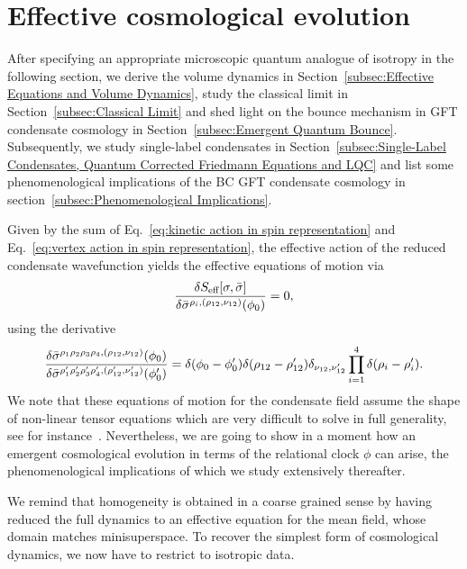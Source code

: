 \documentclass[11pt,a4paper]{article}
\begin{document}
\section{Effective cosmological evolution}\label{sec:Evolution of Effective Cosmology}

 After specifying an appropriate microscopic quantum analogue of isotropy in the following section, we derive the volume dynamics in Section~\ref{subsec:Effective Equations and Volume Dynamics}, study the classical limit in Section~\ref{subsec:Classical Limit} and shed light on the bounce mechanism in GFT condensate cosmology in Section~\ref{subsec:Emergent Quantum Bounce}. Subsequently, we study single-label condensates in Section~\ref{subsec:Single-Label Condensates, Quantum Corrected Friedmann Equations and LQC} and list some phenomenological implications of the BC GFT condensate cosmology in section~\ref{subsec:Phenomenological Implications}.

Given by the sum of Eq.~\eqref{eq:kinetic action in spin representation} and Eq.~\eqref{eq:vertex action in spin representation}, the effective action of the reduced condensate wavefunction yields the effective equations of motion via
%
\begin{equation}
\fdv{S_{\text{eff}}[\sigma,\bar{\sigma}]}{\bar{\sigma}^{\rho_i,(\rho_{12},\nu_{12})}(\phi_0)} = 0,
\end{equation}
%
using the derivative
%
\begin{equation}
\fdv{\bar{\sigma}^{\rho_1 \rho_2 \rho_3 \rho_4,(\rho_{12},\nu_{12})}(\phi_0)}{\bar{\sigma}^{\rho_1' \rho_2' \rho_3' \rho_4',(\rho_{12}',\nu_{12}')}(\phi'_0)}
=
\delta(\phi_0-\phi'_0)\delta(\rho_{12}-\rho_{12}')\delta_{\nu_{12},\nu_{12}'}\prod_{i=1}^4\delta(\rho_i-\rho_i').
\end{equation}
%
We note that these equations of motion for the condensate field assume the shape of non-linear tensor equations which are very difficult to solve in full generality, see for instance~\cite{Fairbairn:2007sv,Girelli:2009yz,Girelli:2010ct,Livine:2011yb,BenGeloun:2018eoe}. Nevertheless, we are going to show in a moment how an emergent cosmological evolution in terms of the relational clock $\phi$ can arise, the phenomenological implications of which we study extensively thereafter. 

We remind that homogeneity is obtained in a coarse grained sense by having reduced the full dynamics to an effective equation for the mean field, whose domain matches minisuperspace. To recover the simplest form of cosmological dynamics, we now have to restrict to isotropic data.
\end{document}
